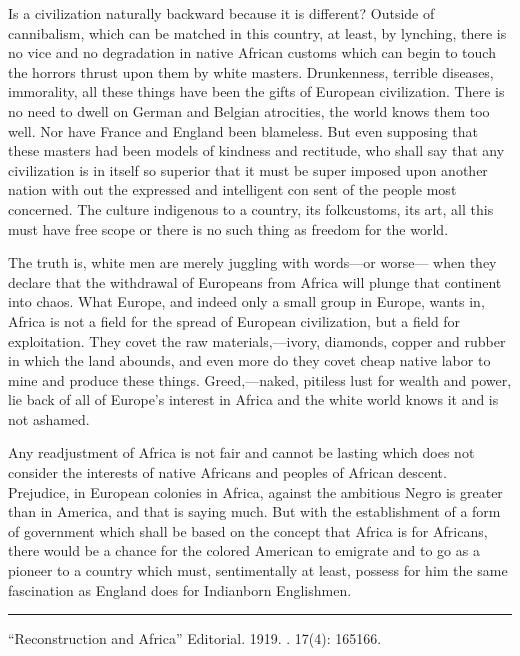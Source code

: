 \documentclass[letterpaper,10pt,english]{jupyterBook}
\begin{document}
\sphinxAtStartPar
Is a civilization naturally backward because it is different? Outside of cannibalism, which can be matched in this country, at least, by lynching, there is no vice and no degradation in native African customs which can begin to touch the horrors thrust upon them by white masters. Drunkenness, terrible diseases, immorality, all these things have been the gifts of European civilization. There is no need to dwell on German and Belgian atrocities, the world knows them too well. Nor have France and England been blameless. But even supposing that these masters had been models of kindness and rectitude, who shall say that any civilization is in itself so superior that it must be super­ imposed upon another nation with­ out the expressed and intelligent con­ sent of the people most concerned. The culture indigenous to a country, its folk\sphinxhyphen{}customs, its art, all this must have free scope or there is no such thing as freedom for the world.

\sphinxAtStartPar
The truth is, white men are merely juggling with words—or worse— when they declare that the withdrawal of Europeans from Africa will plunge that continent into chaos. What Europe, and indeed only a small group in Europe, wants in, Africa is not a field for the spread of European civilization, but a field for exploita­tion. They covet the raw materials,—ivory, diamonds, copper and rubber in which the land abounds, and even more do they covet cheap native labor to mine and produce these things. Greed,—naked, pitiless lust for wealth and power, lie back of all of Europe’s interest in Africa and the white world knows it and is not ashamed.

\sphinxAtStartPar
Any readjustment of Africa is not fair and cannot be lasting which does not consider the interests of native Africans and peoples of African descent. Prejudice, in European colonies in Africa, against the ambitious Negro is greater than in America, and that is saying much. But with the establishment of a form of gov­ernment which shall be based on the concept that Africa is for Africans, there would be a chance for the colored American to emigrate and to go as a pioneer to a country which must, sentimentally at least, possess for him the same fascination as England does for Indian\sphinxhyphen{}born English­men.


\bigskip\hrule\bigskip


\sphinxAtStartPar
{} “Reconstruction and Africa” Editorial. 1919. . 17(4): 165\sphinxhyphen{}166.
\end{document}
